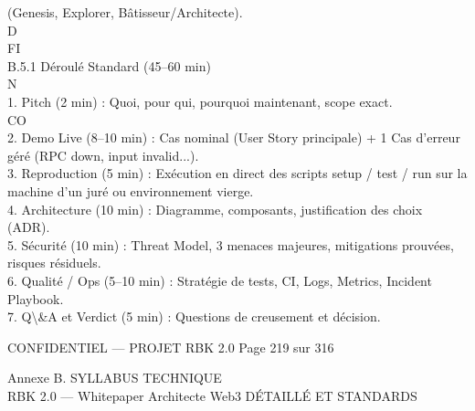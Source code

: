 \documentclass[12pt,landscape,a4paper]{article}
\newenvironment{confidential}
{\begin{tcolorbox}[
    colback=rbkred!5!white,
    colframe=rbkred!75!black,
    title=CONFIDENTIEL,
    fonttitle=\bfseries\color{white},
    coltitle=rbkred!75!black,
    breakable,
    enhanced,
    frame hidden,
    borderline west={2pt}{0pt}{rbkred!75!black}
]}
{\end{tcolorbox}}
\begin{document}
(Genesis, Explorer, Bâtisseur/Architecte).\\
\vspace{0.5em}
\vspace{0.5em}
\vspace{0.5em}
\vspace{0.5em}
D\\
FI\\
B.5.1 Déroulé Standard (45–60 min)\\
\vspace{0.5em}
\vspace{0.5em}
N\\
1. Pitch (2 min) : Quoi, pour qui, pourquoi maintenant, scope exact.\\
CO\\
2. Demo Live (8–10 min) : Cas nominal (User Story principale) + 1 Cas d’erreur géré (RPC down, input invalid...).\\
\vspace{0.5em}
3. Reproduction (5 min) : Exécution en direct des scripts setup / test / run sur la machine d’un juré ou environnement vierge.\\
\vspace{0.5em}
4. Architecture (10 min) : Diagramme, composants, justification des choix (ADR).\\
\vspace{0.5em}
5. Sécurité (10 min) : Threat Model, 3 menaces majeures, mitigations prouvées, risques résiduels.\\
\vspace{0.5em}
6. Qualité / Ops (5–10 min) : Stratégie de tests, CI, Logs, Metrics, Incident Playbook.\\
\vspace{0.5em}
7. Q\textbackslash{}&A et Verdict (5 min) : Questions de creusement et décision.\\
\vspace{0.5em}
\vspace{0.5em}
\vspace{0.5em}
\begin{confidential}CONFIDENTIEL — PROJET RBK 2.0                                Page 219 sur 316\end{confidential}
Annexe B. SYLLABUS TECHNIQUE\\
RBK 2.0 — Whitepaper Architecte Web3                                                                              DÉTAILLÉ ET STANDARDS\\
\vspace{0.5em}
\vspace{0.5em}
\end{document}
